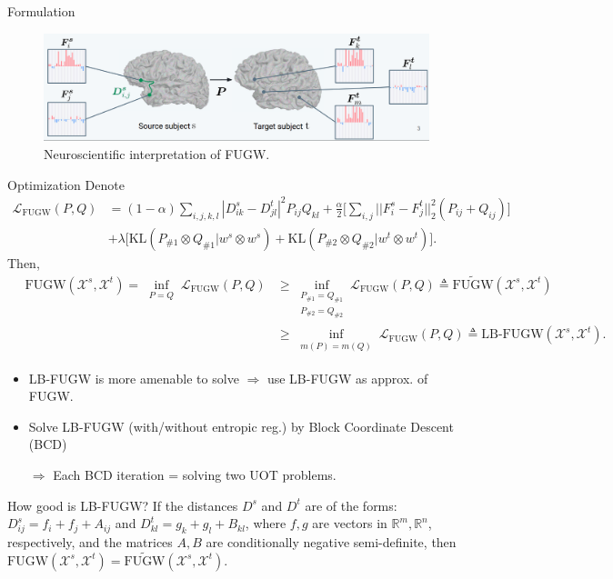 \documentclass{beamer}
\newcommand{\fugw}{\text{FUGW}}
\newcommand{\kl}{\text{KL}}
\newcommand{\cX}{\mathcal X}
\newcommand{\cL}{\mathcal L}
\newcommand{\bbR}{\mathbb R}
\begin{document}
\begin{frame}{Formulation}
\vspace{-0.6cm}
\begin{figure}
  \centering
  \includegraphics[width=1.\linewidth, keepaspectratio=true]{OT_new/fugw.png}
  \caption*{\scriptsize{Neuroscientific interpretation of FUGW.}}
\end{figure}
\end{frame}

\begin{frame}{Optimization}
\scriptsize
Denote
\vspace{-0.3cm}
\begin{align*}
  \cL_{\fugw}(P, Q) &=
  (1 - \alpha) \sum_{i,j,k,l} | D^s_{ik} - D^t_{jl}|^2 P_{ij} Q_{kl}
  + \frac{\alpha}{2} \Big[ \sum_{i,j} || F^s_i - F^t_j||_2^2 (P_{ij} + Q_{ij}) \Big] \\
  &+ \lambda \Big[ \kl(P_{\# 1} \otimes Q_{\# 1} \vert w^s \otimes w^s)
  + \kl(P_{\# 2} \otimes Q_{\# 2} \vert w^t \otimes w^t) \Big].
\end{align*}
\vspace{-0.3cm}
Then,
\begin{align*}
  \quad \fugw(\cX^s, \cX^t) = \inf_{\substack{P = Q}}
  \cL_{\fugw}(P, Q) &\geq \inf_{\substack{P_{\#1} = Q_{\#1} \\ P_{\#2} = Q_{\#2}}}
  \cL_{\fugw}(P, Q) \triangleq \widetilde{\fugw}(\cX^s, \cX^t) \\
  &\geq \inf_{\substack{m(P) = m(Q)}}
  \cL_{\fugw}(P, Q) \triangleq \text{LB-FUGW} (\cX^s, \cX^t).
\end{align*}
\vspace{-0.3cm}
\begin{itemize}
  \item LB-FUGW is more amenable to solve
  $\Rightarrow$ use LB-FUGW as approx. of FUGW.
  \item Solve LB-FUGW (with/without entropic reg.)
  by Block Coordinate Descent (BCD)

  $\Rightarrow$ Each BCD iteration = solving two UOT problems.
\end{itemize}

\begin{block}{How good is LB-FUGW?}
  If the distances $D^s$ and $D^t$ are of the forms: $D^s_{ij} = f_i + f_j + A_{ij}$ and
  $D^t_{kl} = g_k + g_l + B_{kl}$, where $f, g$ are vectors in $\bbR^m, \bbR^n$, respectively,
  and the matrices $A, B$ are conditionally negative semi-definite, then
  $\fugw (\cX^s, \cX^t) = \widetilde{\fugw}(\cX^s, \cX^t)$.
\end{block}

\end{frame}
\end{document}
